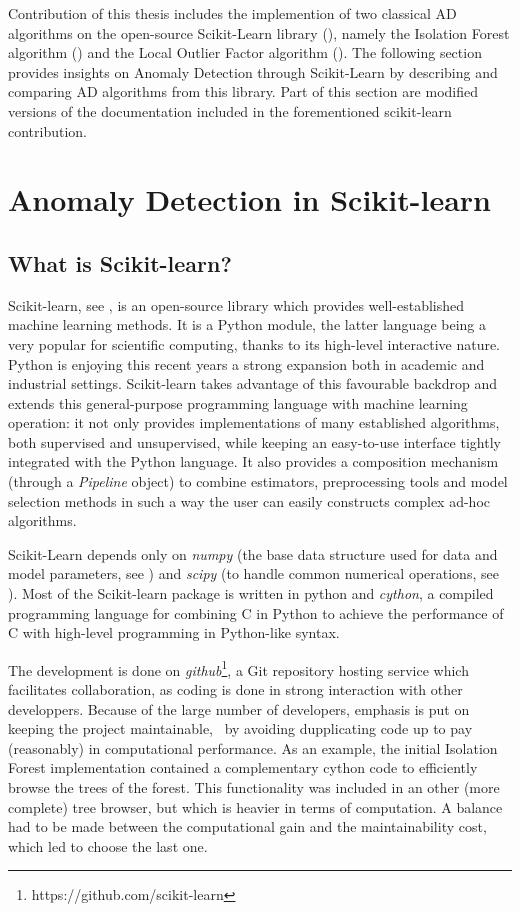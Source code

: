 Contribution of this thesis includes the implemention of two classical AD algorithms on the open-source Scikit-Learn library (\cite{sklearn2011}), namely the Isolation Forest algorithm (\cite{Liu2008}) and the Local Outlier Factor algorithm (\cite{Breunig2000LOF}).
The following section provides insights on Anomaly Detection through Scikit-Learn by describing and comparing AD algorithms from this library. Part of this section are modified versions of the documentation included in the forementioned scikit-learn contribution.

\section{Anomaly Detection in Scikit-learn}
\label{sec:AD_sklearn}

\subsection{What is Scikit-learn?}
Scikit-learn, see \cite{sklearn2011}, is an open-source library which provides well-established machine learning methods.
It is a Python module, the latter language being a very popular for scientific computing, thanks to its high-level interactive nature. Python is enjoying this recent years a strong expansion both in academic and industrial settings. Scikit-learn takes advantage of this favourable backdrop and extends this general-purpose programming language with machine learning operation: it not only provides implementations of many established algorithms, both supervised and unsupervised, while keeping an easy-to-use interface tightly integrated with the Python language. It also provides a composition mechanism (through a \emph{Pipeline} object) to combine estimators, preprocessing tools and model selection methods in such a way the user can easily constructs complex ad-hoc algorithms.

Scikit-Learn depends only on \emph{numpy} (the base data structure used for data and model parameters, see \cite{Vanderwalt2011numpy}) and \emph{scipy} (to handle common numerical operations, see \cite{Jones2015scipy}).
Most of the Scikit-learn package is written in python and \emph{cython}, a compiled programming language for combining C in Python to achieve the performance of C with high-level programming in Python-like syntax.


The development is done on \emph{github}\footnote{https://github.com/scikit-learn}, a Git repository hosting service which facilitates collaboration, as coding is done in strong interaction with other developpers. Because of the large number of developers, emphasis is put on keeping the project maintainable, \eg~by avoiding dupplicating code up to pay (reasonably) in computational performance. As an example, the initial Isolation Forest implementation contained a complementary cython code to efficiently browse the trees of the forest. This functionality was included in an other (more complete) tree browser, but which is heavier in terms of computation. A balance had to be made between the computational gain and the maintainability cost, which led to choose the last one.


